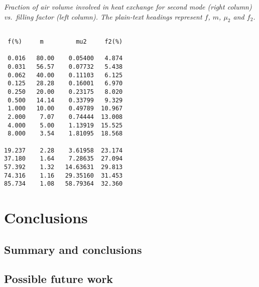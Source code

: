 \documentclass[12pt,openany,a4paper]{book}
\renewcommand{\baselinestretch}{1.2}	%
\begin{document}
\begin{table}\renewcommand{\baselinestretch}{1.0}
\caption{\sl Fraction of air volume involved in heat exchange for
second mode (right column) vs.\ filling factor (left column).  The
plain-text headings represent $f$, $m$, $\mu_2$ and $f_2$.}
\label{tf2}

\begin{center}
\begin{minipage}[c]{2.85in}\small\normalsize
\begin{verbatim}

 f(%)     m         mu2     f2(%)

 0.016   80.00    0.05400   4.874
 0.031   56.57    0.07732   5.438
 0.062   40.00    0.11103   6.125
 0.125   28.28    0.16001   6.970
 0.250   20.00    0.23175   8.020
 0.500   14.14    0.33799   9.329
 1.000   10.00    0.49789  10.967
 2.000    7.07    0.74444  13.008
 4.000    5.00    1.13919  15.525
 8.000    3.54    1.81095  18.568

19.237    2.28    3.61958  23.174
37.180    1.64    7.28635  27.094
57.392    1.32   14.63631  29.813
74.316    1.16   29.35160  31.453
85.734    1.08   58.79364  32.360
\end{verbatim}
\end{minipage}
\end{center}
\end{table}

\chapter{Conclusions}

\section{Summary and conclusions}

\section{Possible future work}

\appendix


\newpage
{}
\mbox{}
\newpage

\end{document}
